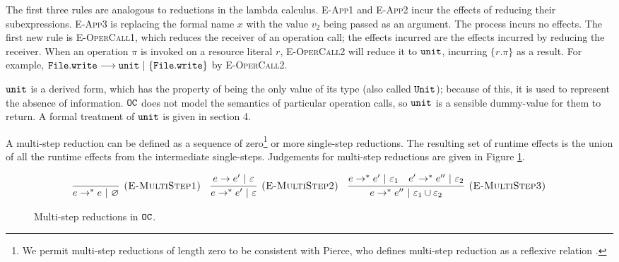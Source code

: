 The first three rules are analogous to reductions in the lambda calculus. \textsc{E-App1} and \textsc{E-App2} incur the effects of reducing their subexpressions. \textsc{E-App3} is replacing the formal name $x$ with the value $v_2$ being passed as an argument. The process incurs no effects. The first new rule is \textsc{E-OperCall1}, which reduces the receiver of an operation call; the effects incurred are the effects incurred by reducing the receiver. When an operation $\pi$ is invoked on a resource literal $r$, \textsc{E-OperCall2} will reduce it to $\mathtt{unit}$, incurring $\{ r.\pi \}$ as a result. For example, $\mathtt{File.write} \longrightarrow \mathtt{unit}~|~\{ \mathtt{File.write} \}$ by \textsc{E-OperCall2}.

$\mathtt{unit}$ is a derived form, which has the property of being the only value of its type (also called $\mathtt{Unit}$); because of this, it is used to represent the absence of information. $\mathtt{OC}$ does not model the semantics of particular operation calls, so $\mathtt{unit}$ is a sensible dummy-value for them to return. A formal treatment of $\mathtt{unit}$ is given in section 4.

A multi-step reduction can be defined as a sequence of zero\footnote{We permit multi-step reductions of length zero to be consistent with Pierce, who defines multi-step reduction as a reflexive relation \cite[p. 39]{pierce02}.} or more single-step reductions. The resulting set of runtime effects is the union of all the runtime effects from the intermediate single-steps. Judgements for multi-step reductions are given in Figure \ref{fig:opercalc_multistep_defn}.

\begin{figure}[h]

\noindent
{}

\[
\begin{array}{c}

\infer[\textsc{(E-MultiStep1)}]
	{ e \rightarrow^{*}  e~|~\varnothing}
	{}
~~~
\infer[\textsc{(E-MultiStep2)}]
	{ e \rightarrow^{*}  e'~|~\varepsilon}
	{ e \rightarrow  e'~|~\varepsilon}
~~~	
\infer[\textsc{(E-MultiStep3)}]
	{ e \rightarrow^{*}  e''~|~\varepsilon_1 \cup \varepsilon_2}
	{ e \rightarrow^{*}  e'~|~\varepsilon_1 &  e' \rightarrow^{*}  e''~|~\varepsilon_2}
\end{array}
\]

\vspace{-7pt}
\caption{Multi-step reductions in $\mathtt{OC}$.}
\label{fig:opercalc_multistep_defn}
\end{figure}

